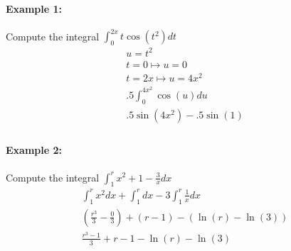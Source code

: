 \documentclass[../revisedmain.tex]{subfiles}
\begin{document}
\paragraph{Example 1:}Compute the integral $\int_{0}^{2x}t\cos(t^2)dt$
\begin{gather*}
	u=t^2\\
	t=0\mapsto u=0\\
	t=2x\mapsto u=4x^2\\
	.5\int_{0}^{4x^2}\cos(u)du\\
	.5\sin(4x^2)-.5\sin(1)\\
\end{gather*}
\paragraph{Example 2:}Compute the integral $\int_{1}^{r}x^2+1-\frac{3}{x}dx$
\begin{gather*}
	\int_{1}^{r}x^2dx+\int_{1}^{r}dx-3\int_{1}^{r}\frac{1}{x}dx\\
	(\frac{r^3}{3}-\frac{0}{3})+(r-1)-(\ln(r)-\ln(3))\\
	\frac{r^3-1}{3}+r-1-\ln(r)-\ln(3)\\
\end{gather*}
\end{document}
